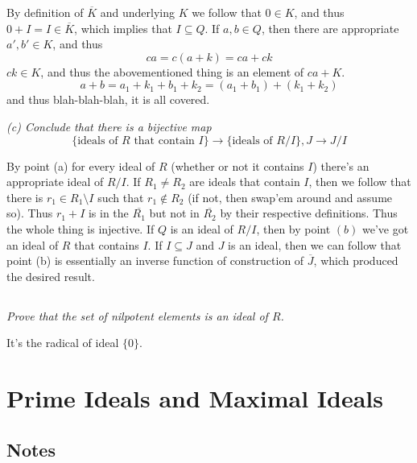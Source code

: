 \documentclass[11pt,oneside,titlepage]{book}
\newcommand{\set}[1]{\{ #1 \}}
\begin{document}
By definition of $\overline{K}$ and underlying $K$ we follow that $0
\in K$, and thus $0 + I = I \in \overline{K}$, which implies that $I
\subseteq Q$. If $a, b \in Q$, then there are appropriate $a', b' \in
K$, and thus
$$ca = c (a + k) = ca + ck$$
$ck \in K$, and thus the abovementioned thing is an element of $ca +
K$.
$$a + b = a_1 + k_1 + b_1 + k_2 = (a_1 + b_1) + (k_1 + k_2)$$
and thus blah-blah-blah, it is all covered.

\textit{(c) Conclude that there is a bijective map
  $$ \set{\text{ideals of }R\text{ that contain } I} \to \set{\text{ideals of }R/I}, J \to J/I$$}

By point (a) for every ideal of $R$ (whether or not it contains $I$)
there's an appropriate ideal of $R/I$. If $R_1 \neq R_2$ are ideals
that contain $I$, then we follow that there is $r_1 \in R_1 \setminus
I$ such that $r_1 \notin R_2$ (if not, then swap'em around and assume
so). Thus $r_1 + I$ is in the $\overline{R_1}$ but not in
$\overline{R_2}$ by their respective definitions. Thus the whole thing
is injective. If $Q$ is an ideal of $R/I$, then by point $(b)$ we've
got an ideal of $R$ that contains $I$. If $I \subseteq J$ and $J$ is
an ideal, then we can follow that point (b) is essentially an inverse
function of construction of $\overline{J}$, which produced the desired
result.


\subsection{}

\textit{Prove that the set of nilpotent elements is an ideal of $R$.}

It's the radical of ideal $\set{0}$.

\section{Prime Ideals and Maximal Ideals}

\subsection*{Notes}
\end{document}
